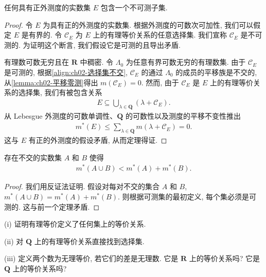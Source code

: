 \documentclass[../../main.tex]{subfiles}
\begin{document}
\begin{theorem}[Vitali]\label{theorem:ch02-Vitali}
任何具有正外测度的实数集 $E$ 包含一个不可测子集.
\end{theorem}

\begin{proof}
令 $E$ 为具有正的外测度的实数集. 根据外测度的可数次可加性, 我们可以假定 $E$ 是有界的. 令 $\mathcal{C}_{E}$ 为 $E$ 上的有理等价关系的任意选择集. 我们宣称 $\mathcal{C}_{E}$ 是不可测的. 为证明这个断言, 我们假设它是可测的且导出矛盾.

有理数可数无穷且在 $\mathbf{R}$ 中稠密. 令 $\Lambda_{0}$ 为任意有界可数无穷的有理数集. 由于 $\mathcal{C}_{E}$ 是可测的, 根据\eqref{align:ch02-选择集不交}, $\mathcal{C}_{E}$ 的通过 $\Lambda_{0}$ 的成员的平移族是不交的, 从\cref{lemma:ch02-平移零测}得出 $m(\mathcal{C}_{E})=0$. 然而, 由于 $\mathcal{C}_{E}$ 是 $E$ 上的有理等价关系的选择集, 我们有被包含关系
\begin{align}
E\subseteq\bigcup_{\lambda\in\mathbf{Q}}(\lambda+\mathcal{C}_{E}).\label{align:ch02-E覆盖}
\end{align}
从 Lebesgue 外测度的可数单调性、$\mathbf{Q}$ 的可数性以及测度的平移不变性推出
\begin{align*}
m^{*}(E)\leqslant\sum_{\lambda\in\mathbf{Q}}m(\lambda+\mathcal{C}_{E})=0.
\end{align*}
这与 $E$ 有正的外测度的假设矛盾, 从而定理得证.
\end{proof}

\begin{theorem}\label{theorem:ch02-不可加}
存在不交的实数集 $A$ 和 $B$ 使得
\begin{align*}
m^{*}(A\cup B)<m^{*}(A)+m^{*}(B).
\end{align*}
\end{theorem}

\begin{proof}
我们用反证法证明. 假设对每对不交的集合 $A$ 和 $B$, $m^{*}(A\cup B)=m^{*}(A)+m^{*}(B)$. 则根据可测集的最初定义, 每个集必须是可测的. 这与前一个定理矛盾.
\end{proof}

\begin{exercise}\label{exercise:ch02-29}
(i) 证明有理等价定义了任何集上的等价关系.

(ii) 对 $\mathbf{Q}$ 上的有理等价关系直接找到选择集.

(iii) 定义两个数为无理等价, 若它们的差是无理数. 它是 $\mathbf{R}$ 上的等价关系吗? 它是 $\mathbf{Q}$ 上的等价关系吗?
\end{exercise}
\end{document}
